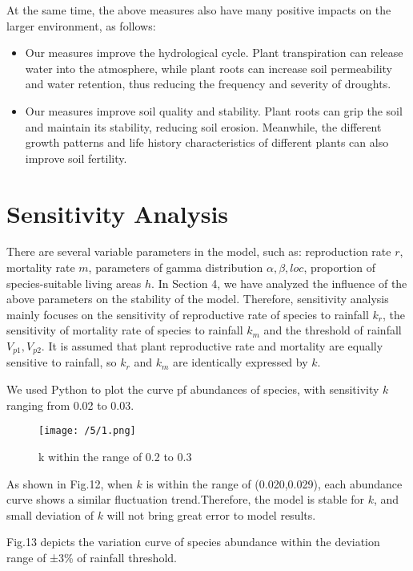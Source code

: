 \documentclass{mcmthesis}
\begin{document}
At the same time, the above measures also have many positive impacts on the larger environment, as follows:

\begin{itemize}
	\item Our measures improve the hydrological cycle. Plant transpiration can release water into the atmosphere, while plant roots can increase soil permeability and water retention, thus reducing the frequency and severity of droughts.
	
	\item Our measures improve soil quality and stability. Plant roots can grip the soil and maintain its stability, reducing soil erosion. Meanwhile, the different growth patterns and life history characteristics of different plants can also improve soil fertility.
\end{itemize}

\section{Sensitivity Analysis}

There are several variable parameters in the model, such as: reproduction rate $r$, mortality rate $m$, parameters of gamma distribution $\alpha, \beta, loc$, proportion of species-suitable living  areas $h$. In Section 4, we have analyzed the influence of the above parameters on the stability of the model. Therefore, sensitivity analysis mainly focuses on the sensitivity of reproductive rate of species to rainfall $k_r$, the sensitivity of mortality rate of species to rainfall $k_m$ and the threshold of rainfall $V_{p1},V_{p2}$. It is assumed that plant reproductive rate and mortality are equally sensitive to rainfall,  so $k_r$ and $k_m$ are identically expressed by $k$.

We used Python to plot the curve pf abundances of species, with sensitivity $k$ ranging from 0.02 to 0.03.

\begin{figure}[h]\label{5.1}
	\centering
	\texttt{[image: /5/1.png]}
	\caption{k within the range of 0.2 to 0.3} 
\end{figure}

As shown in Fig.12, when $k$ is within the range of (0.020,0.029), each abundance curve shows a similar fluctuation trend.Therefore, the model is stable for $k$, and small deviation of $k$ will not bring great error to model results.

Fig.13 depicts the variation curve of species abundance within the deviation range of ±3\% of rainfall threshold.
\end{document}
